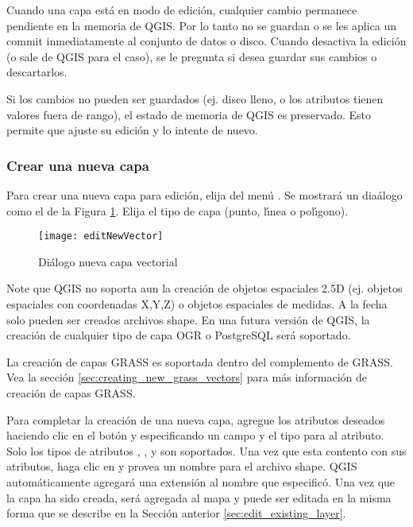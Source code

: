 Cuando una capa est\'a en modo de edici\'on, cualquier cambio permanece pendiente en la memoria de QGIS.
Por lo tanto no se guardan o se les aplica un commit inmediatamente al conjunto de datos o disco.
Cuando desactiva la edici\'on (o sale de QGIS para el caso), 
se le pregunta si desea guardar sus cambios o
descartarlos.

Si los cambios no pueden ser guardados (ej. disco lleno, o los atributos tienen
valores fuera de rango), el estado de memoria de QGIS es preservado.  Esto
permite que ajuste su edici\'on y lo intente de nuevo.

\subsubsection{Crear una nueva capa}\label{sec:create shape}

Para crear una nueva capa para edici\'on, elija  del
 men\'u . 
Se mostrar\'a un dia\'alogo  como el de la
Figura \ref{fig:newvectorlayer}. Elija el tipo de capa (punto,
l\'{\i}nea o pol\'{\i}gono).

\begin{figure}[ht]
   \begin{center}
   \caption{Di\'alogo nueva capa vectorial \nixcaption}\label{fig:newvectorlayer}\smallskip
   \texttt{[image: editNewVector]}
\end{center} 
\end{figure}

Note que QGIS no soporta aun la creaci\'on de
objetos espaciales 2.5D (ej. objetos espaciales con coordenadas X,Y,Z) o objetos espaciales de medidas.
A la fecha solo pueden ser creados archivos shape. En una futura versi\'on de QGIS, la creaci\'on de cualquier tipo
de capa OGR o PostgreSQL ser\'a soportado. 

La creaci\'on de capas GRASS es soportada dentro del complemento de GRASS. Vea la secci\'on 
\ref{sec:creating_new_grass_vectors} para más informaci\'on de creaci\'on de capas GRASS.

Para completar la creaci\'on de una nueva capa, agregue los atributos deseados haciendo
clic en el bot\'on   y especificando un campo y el tipo para al atributo.
Solo los tipos de atributos , , y  son soportados. Una vez que esta contento con sus atributos,
haga clic en  y provea un nombre para el archivo shape.
QGIS autom\'aticamente agregar\'a una extensi\'on  al nombre que especific\'o. Una vez
que la capa ha sido creada, ser\'a agregada al mapa y puede ser editada en la misma forma
que se describe en la Secci\'on anterior \ref{sec:edit_existing_layer}. 

